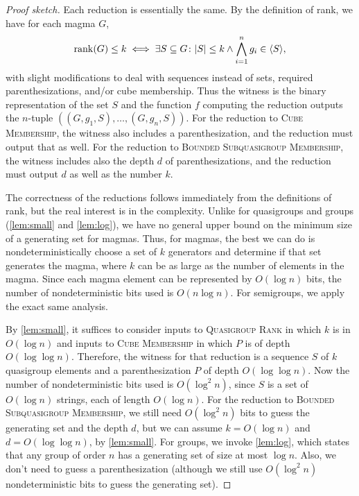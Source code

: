 \begin{proof}[Proof sketch]
  Each reduction is essentially the same.
  By the definition of rank, we have for each magma $G$,
  \begin{equation*}
    \operatorname{rank}(G) \leq k \iff \exists S \subseteq G \colon |S| \leq k \land \bigwedge_{i = 1}^n g_i \in \langle S \rangle,
  \end{equation*}
  with slight modifications to deal with sequences instead of sets, required parenthesizations, and/or cube membership.
  Thus the witness is the binary representation of the set $S$ and the function $f$ computing the reduction outputs the $n$-tuple $((G, g_1, S), \dotsc, (G, g_n, S))$.
  For the reduction to \textsc{Cube Membership}, the witness also includes a parenthesization, and the reduction must output that as well.
  For the reduction to \textsc{Bounded Subquasigroup Membership}, the witness includes also the depth $d$ of parenthesizations, and the reduction must output $d$ as well as the number $k$.

  The correctness of the reductions follows immediately from the definitions of rank, but the real interest is in the complexity.
  Unlike for quasigroups and groups (\autoref{lem:small} and \autoref{lem:log}), we have no general upper bound on the minimum size of a generating set for magmas.
  Thus, for magmas, the best we can do is nondeterministically choose a set of $k$ generators and determine if that set generates the magma, where $k$ can be as large as the number of elements in the magma.
  Since each magma element can be represented by $O(\log n)$ bits, the number of nondeterministic bits used is $O(n \log n)$.
  For semigroups, we apply the exact same analysis.

  By \autoref{lem:small}, it suffices to consider inputs to \textsc{Quasigroup Rank} in which $k$ is in $O(\log n)$ and inputs to \textsc{Cube Membership} in which $P$ is of depth $O(\log \log n)$.
  Therefore, the witness for that reduction is a sequence $S$ of $k$ quasigroup elements and a parenthesization $P$ of depth $O(\log \log n)$.
  Now the number of nondeterministic bits used is $O(\log^2 n)$, since $S$ is a set of $O(\log n)$ strings, each of length $O(\log n)$.
  For the reduction to \textsc{Bounded Subquasigroup Membership}, we still need $O(\log^2 n)$ bits to guess the generating set and the depth $d$, but we can assume $k = O(\log n)$ and $d = O(\log \log n)$, by \autoref{lem:small}.
  For groups, we invoke \autoref{lem:log}, which states that any group of order $n$ has a generating set of size at most $\log n$.
  Also, we don't need to guess a parenthesization (although we still use $O(\log^2 n)$ nondeterministic bits to guess the generating set).
\end{proof}

